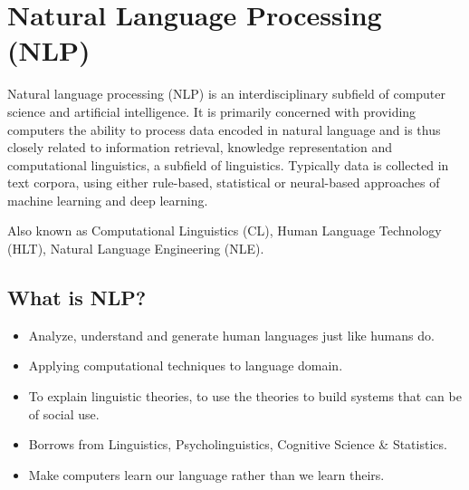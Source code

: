 \chapter{Natural Language Processing (NLP)}\label{chap: nlp}

Natural language processing (NLP) is an interdisciplinary subfield of computer science and artificial intelligence. It is primarily concerned with providing computers the ability to process data encoded in natural language and is thus closely related to information retrieval, knowledge representation and computational linguistics, a subfield of linguistics. Typically data is collected in text corpora, using either rule-based, statistical or neural-based approaches of machine learning and deep learning.\cite{wiki-nlp}

Also known as Computational Linguistics (CL), Human Language Technology (HLT), Natural Language Engineering (NLE).

\section{What is NLP?}
\begin{itemize}
    \item Analyze, understand and generate human languages just like humans do.
    \item Applying computational techniques to language domain.
    \item To explain linguistic theories, to use the theories to build systems that can be of social use.
    \item Borrows from Linguistics, Psycholinguistics, Cognitive Science \& Statistics.
    \item Make computers learn our language rather than we learn theirs.
\end{itemize}

